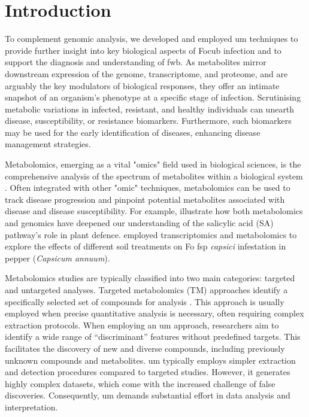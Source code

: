 
\section{Introduction}

To complement genomic analysis, we developed and employed \acl{um} techniques to provide further insight into key biological aspects of \ac{Focub} infection and to support the diagnosis and understanding of \ac{fwb}. As metabolites mirror downstream expression of the genome, transcriptome, and proteome, and are arguably the key modulators of biological responses, they offer an intimate snapshot of an organism's phenotype at a specific stage of infection. Scrutinising metabolic variations in infected, resistant, and healthy individuals can unearth disease, susceptibility, or resistance biomarkers. Furthermore, such biomarkers may be used for the early identification of diseases, enhancing disease management strategies. 

Metabolomics, emerging as a vital "omics" field used in biological sciences, is the comprehensive analysis of the spectrum of metabolites within a biological system \parencite{Klassen2017}. Often integrated with other "omic" techniques, metabolomics can be used to track disease progression and pinpoint potential metabolites associated with disease and disease susceptibility. For example, \textcite{Crandall2020} illustrate how both metabolomics and genomics have deepened our understanding of the salicylic acid (SA) pathway's role in plant defence. \textcite{Zhu2021} employed transcriptomics and metabolomics to explore the effects of different soil treatments on \ac{Fo} \ac{fsp} \textit{capsici} infestation in pepper (\textit{Capsicum annuum}). 

Metabolomics studies are typically classified into two main categories: targeted and untargeted analyses. Targeted metabolomics (TM) approaches identify a specifically selected set of compounds for analysis \parencite{Allwood2021}. This approach is usually employed when precise quantitative analysis is necessary, often requiring complex extraction protocols. When employing an \acf{um} approach, researchers aim to identify a wide range of “discriminant” features without predefined targets. This facilitates the discovery of new and diverse compounds, including previously unknown compounds and metabolites. \ac{um} typically employs simpler extraction and detection procedures compared to targeted studies. However, it generates highly complex datasets, which come with the increased challenge of false discoveries. Consequently, \ac{um} demands substantial effort in data analysis and interpretation.

